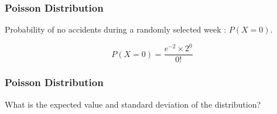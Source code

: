 \documentclass{beamer}
\begin{document}
\begin{frame}
\frametitle{Poisson Distribution}
\Large
\vspace{-2.5cm}
\Large
Probability of no accidents during a randomly selected week : $ P(X = 0)$.

\[ P(X=0) =  \frac{e^{-2} \times 2^0}{0!}  \]

\end{frame}
\begin{frame}
\frametitle{Poisson Distribution}
\Large
\vspace{-1.5cm}
What is the expected value and standard deviation of the distribution? 
\end{frame}

\end{document}
